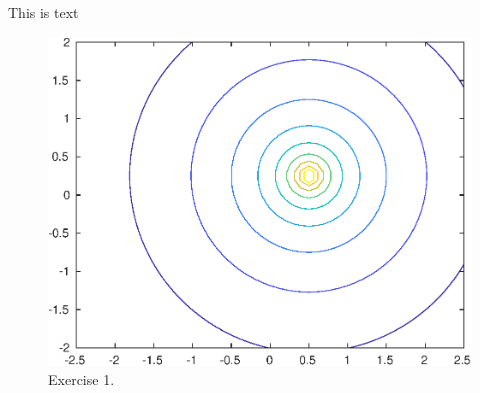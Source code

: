 



\justify
This is text
\begin{figure}[htbp]
\centering
\includegraphics[scale=0.8]{LaTeX/Week_1/graphs/exercise1.eps}
\caption{Exercise 1.}
\label{Exercise 1 streamfunction contour plot}
\end{figure}